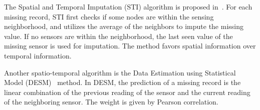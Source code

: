 The Spatial and Temporal Imputation (STI) algorithm is proposed in~\cite{li2008spatial}. 
For each missing record, STI first checks if some nodes are within the sensing neighborhood, and utilizes
the average of the neighbors to impute the missing value. If no sensors are within the neighborhood, the last seen value of the 
missing sensor is used for imputation. The method favors spatial information over temporal information.




Another spatio-temporal algorithm is the Data Estimation using Statistical Model (DESM)~\cite{li2008data} method.  
In DESM, the prediction of a missing record is the linear combination of the previous reading of the sensor and the current reading of the neighboring sensor. The weight is given by Pearson correlation.

